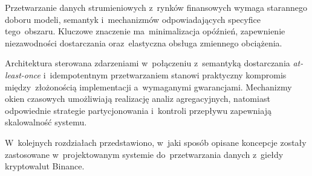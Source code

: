 Przetwarzanie danych strumieniowych z~rynków finansowych wymaga starannego doboru modeli, semantyk i~mechanizmów
odpowiadających specyfice tego~obszaru.
Kluczowe znaczenie ma~minimalizacja opóźnień, zapewnienie niezawodności dostarczania oraz~elastyczna obsługa
zmiennego obciążenia.

Architektura sterowana zdarzeniami w~połączeniu z~semantyką dostarczania \textit{at-least-once} i~idempotentnym
przetwarzaniem stanowi praktyczny kompromis między~złożonością implementacji a~wymaganymi gwarancjami.
Mechanizmy okien czasowych umożliwiają realizację analiz agregacyjnych, natomiast odpowiednie strategie
partycjonowania i~kontroli przepływu zapewniają skalowalność systemu.

W~kolejnych rozdziałach przedstawiono, w~jaki sposób opisane koncepcje zostały zastosowane w~projektowanym systemie
do~przetwarzania danych z~giełdy kryptowalut Binance.

